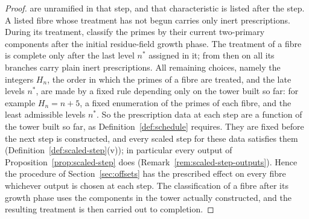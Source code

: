 \documentclass[11pt]{article}
\theoremstyle{plain}
\theoremstyle{definition}
\theoremstyle{remark}
\begin{document}
\begin{proof}
are unramified in that step, and that characteristic is listed after
the step.
A listed fibre whose treatment has not begun carries only inert
prescriptions.  During its treatment, classify the primes by their current
two-primary components after the initial residue-field growth phase.  The
treatment of a fibre is complete only after the last level $n^*$
assigned in it; from then on all its branches carry plain inert
prescriptions.  All remaining choices, namely the integers $H_n$, the
order in which the primes of a fibre are treated, and the late levels
$n^*$, are made by a fixed rule depending only on the tower built so far:
for example $H_n=n+5$, a fixed enumeration of the primes of each fibre,
and the least admissible levels $n^*$.  So the prescription data at each
step are a function of the tower built so far, as
Definition~\ref{def:schedule} requires.  They are fixed before the next
step is constructed, and every scaled step for these data satisfies them
(Definition~\ref{def:scaled-step}(v)); in particular every output of
Proposition~\ref{prop:scaled-step} does
(Remark~\ref{rem:scaled-step-outputs}).
Hence the procedure of Section~\ref{sec:offsets} has the prescribed
effect on every fibre whichever output is chosen at each step.  The
classification of a fibre after its growth phase uses the components in
the tower actually constructed, and the resulting treatment is then
carried out to completion.


\end{proof}
\end{document}
